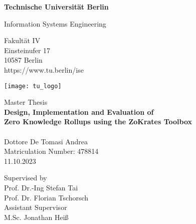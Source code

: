 \thispagestyle{empty}
\begin{center}

\vspace*{1cm}
{\LARGE \textbf{Technische Universität Berlin}}

\vspace{0.5cm}

{\large Information Systems Engineering\\[1mm]}

Fakultät IV\\
Einsteinufer 17\\
10587 Berlin\\
https://www.tu.berlin/ise\\

\vspace*{1cm}

\texttt{[image: tu\_logo]}

\vspace*{1.0cm}

{\LARGE Master Thesis}\\

\vspace{1.0cm}
{\LARGE \textbf{Design, Implementation and Evaluation of}}\\
\vspace*{0.2cm}
{\LARGE \textbf{Zero Knowledge Rollups using the ZoKrates Toolbox}}\\
\vspace*{0.2cm}
{\LARGE \textbf{}}\\
\vspace*{1.0cm}
{\LARGE Dottore De Tomasi Andrea}
\\
\vspace*{0.5cm}
Matriculation Number: 478814\\
11.10.2023\\
\vspace*{1.2cm}

Supervised by\\
Prof. Dr.-Ing Stefan Tai\\
Prof. Dr. Florian Tschorsch\\
\vspace*{0.2cm}
Assistant Supervisor\\
M.Sc. Jonathan Heiß
\end{center}
